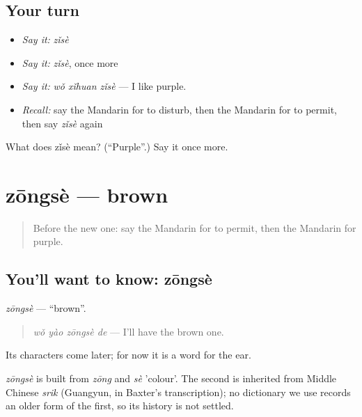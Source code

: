 \subsection*{Your turn}
\begin{itemize}
\raggedright
  \item \emph{Say it:} \emph{zǐsè}
  \item \emph{Say it:} \emph{zǐsè}, once more
  \item \emph{Say it:} \emph{wǒ xǐhuan zǐsè} — I like purple.
  \item \emph{Recall:} say the Mandarin for to disturb, then the Mandarin for to permit, then say \emph{zǐsè} again
\end{itemize}

\begin{tcolorbox}[breakable,colback=teal!4,colframe=teal!35!black,title={Before you move on}]
What does zǐsè mean? (\textquotedblleft{}Purple\textquotedblright{}.) Say it once more.
\end{tcolorbox}
\section[zōngsè]{zōngsè — brown}

\label{lesson:ZH-C210-zongse}



\begin{quote}
Before the new one: say the Mandarin for to permit, then the Mandarin for purple.
\end{quote}

\subsection*{You'll want to know: zōngsè}
\emph{zōngsè} — \textquotedblleft{}brown\textquotedblright{}.

\begin{quote}
\emph{wǒ yào zōngsè de} — I'll have the brown one.
\end{quote}

Its characters come later; for now it is a word for the ear.

\begin{cousinweb}
\emph{zōngsè} is built from \emph{zōng} and \emph{sè} 'colour'. The second is inherited from Middle Chinese \emph{srik} (Guangyun, in Baxter's transcription); no dictionary we use records an older form of the first, so its history is not settled.
\end{cousinweb}

